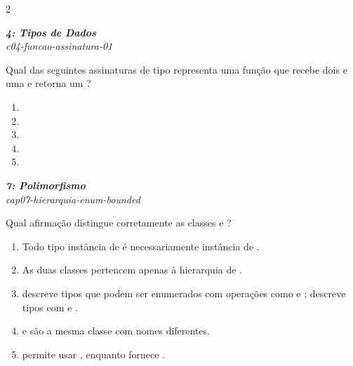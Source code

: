 \documentclass[a4paper,10pt,brazil]{article}
\begin{document}
\begin{multicols}{2}
\begin{enumerate}
\end{enumerate}

\begin{flushright}
  \footnotesize
  \textit{\textbf{4: Tipos de Dados}}\\
  \textit{c04-funcao-assinatura-01}\\

\end{flushright}
Qual das seguintes assinaturas de tipo representa uma função que recebe dois  e uma  e retorna um ?

\begin{enumerate}
  \item {}

  \item {}

  \item {}

  \item {}

  \item {}


\end{enumerate}

\begin{flushright}
  \footnotesize
  \textit{\textbf{7: Polimorfismo}}\\
  \textit{cap07-hierarquia-enum-bounded}\\

\end{flushright}
Qual afirmação distingue corretamente as classes  e ?
\begin{enumerate}
  \item Todo tipo instância de  é necessariamente instância de .
  \item As duas classes pertencem apenas à hierarquia de .
  \item {} descreve tipos que podem ser enumerados com operações como  e ;  descreve tipos com  e .
  \item {} e  são a mesma classe com nomes diferentes.
  \item {} permite usar , enquanto  fornece .


\end{enumerate}
\end{multicols}
\end{document}

